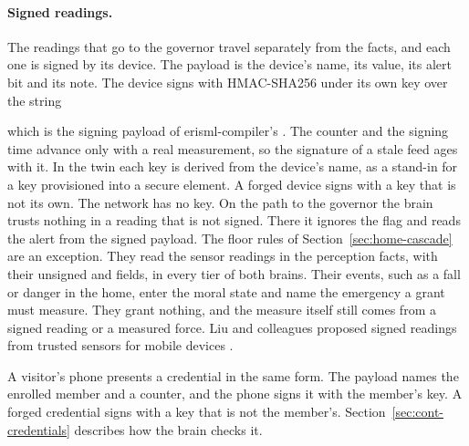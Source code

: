 \paragraph{Signed readings.} The readings that go to the governor travel separately from the facts,
and each one is signed by its device. The payload is the device's name, its value, its alert bit and
its note. The device signs with HMAC-SHA256 under its own key over the string
\begin{center}\end{center}
which is the signing payload of erisml-compiler's . The counter and the signing time advance only with a real measurement, so
the signature of a stale feed ages with it. In the twin each key is derived from the device's name,
as a stand-in for a key provisioned into a secure element. A forged device signs with a key that is
not its own. The network has no key. On the path to the governor the brain trusts nothing in a
reading that is not signed. There it ignores the  flag and reads the alert from the
signed payload. The floor rules of Section~\ref{sec:home-cascade} are an exception. They read the
sensor readings in the perception facts, with their unsigned  and 
fields, in every tier of both brains. Their events, such as a fall or danger in the home, enter the
moral state and name the emergency a grant must measure. They grant nothing, and the measure
itself still comes from a signed reading or a measured force. Liu and colleagues
proposed signed readings from trusted sensors for mobile devices \cite{liu2012trustedsensors}.

A visitor's phone presents a credential in the same form. The payload names the enrolled member and a
counter, and the phone signs it with the member's key. A forged credential signs with a key that is
not the member's. Section~\ref{sec:cont-credentials} describes how the brain checks it.

